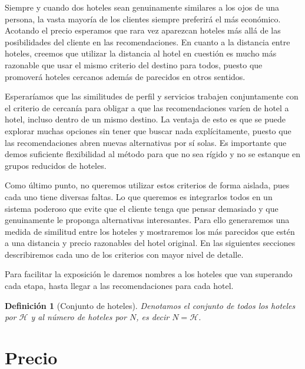 \documentclass[12pt]{report}
\newtheorem{defn}{Definici\'on}[chapter]
\begin{document}
Siempre y cuando dos hoteles sean genuinamente similares a los ojos de una persona, la vasta mayoría de los clientes siempre preferirá el más económico. Acotando el precio esperamos que rara vez aparezcan hoteles más allá de las posibilidades del cliente en las recomendaciones. En cuanto a la distancia entre hoteles, creemos que utilizar la distancia al hotel en cuestión es mucho más razonable que usar el mismo criterio del destino para todos, puesto que promoverá hoteles cercanos además de parecidos en otros sentidos.

Esperaríamos que las similitudes de perfil y servicios trabajen conjuntamente con el criterio de cercanía para obligar a que las recomendaciones varíen de hotel a hotel, incluso dentro de un mismo destino. La ventaja de esto es que se puede explorar muchas opciones sin tener que buscar nada explícitamente, puesto que las recomendaciones abren nuevas alternativas por sí solas. Es importante que demos suficiente flexibilidad al método para que no sea rígido y no se estanque en grupos reducidos de hoteles.

Como último punto, no queremos utilizar estos criterios de forma aislada, pues cada uno tiene diversas faltas. Lo que queremos es integrarlos todos en un sistema poderoso que evite que el cliente tenga que pensar demasiado y que genuinamente le proponga alternativas interesantes. Para ello generaremos una medida de similitud entre los hoteles y mostraremos los más parecidos que estén a una distancia y precio razonables del hotel original. En las siguientes secciones describiremos cada uno de los criterios con mayor nivel de detalle.

Para facilitar la exposición le daremos nombres a los hoteles que van superando cada etapa, hasta llegar a las recomendaciones para cada hotel.
\begin{defn}[Conjunto de hoteles]
Denotamos el conjunto de todos los hoteles por $\mathcal{H}$ y al número de hoteles por $N$, es decir $N = \mathcal{H}$.
\end{defn}

\section{Precio}
\end{document}
